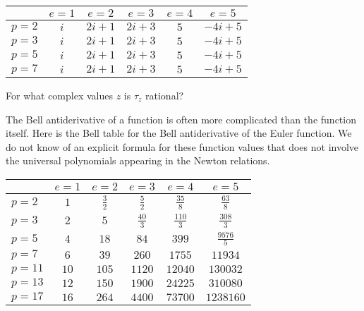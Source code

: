 \begin{example}
\begin{center}
\begin{tabular}{| l | | c | c | c | c | c |}
\hline
& $e = 1$ & $e = 2$ & $e = 3$ & $e = 4$ & $e = 5$\\
\hline
\hline
$p = 2$ & $i$ & $2 i + 1$ & $2 i + 3$ & $5$ & $-4 i + 5$ \\
\hline
$p = 3$ & $i$ & $2 i + 1$ & $2 i + 3$ & $5$ & $-4 i + 5$ \\
\hline
$p = 5$ & $i$ & $2 i + 1$ & $2 i + 3$ & $5$ & $-4 i + 5$ \\
\hline
$p = 7$ & $i$ & $2 i + 1$ & $2 i + 3$ & $5$ & $-4 i + 5$ \\
\hline
\end{tabular}
\end{center}
\end{example}

\begin{exercise}
For what complex values $z$ is $\tau_z$ rational?
\end{exercise}

\begin{example}
The Bell antiderivative of a function is often more complicated than the function itself. Here is the Bell table for the Bell antiderivative of the Euler function. We do not know of an explicit formula for these function values that does not involve the universal polynomials appearing in the Newton relations.
\vskip10pt
\begin{center}

\begin{tabular}{| l | | c | c | c | c | c |}
\hline
& $e = 1$ & $e = 2$ & $e = 3$ & $e = 4$ & $e = 5$\\
\hline
\hline
$p = 2$ & $1$ & $\frac{3}{2}$ & $\frac{5}{2}$ & $\frac{35}{8}$ & $\frac{63}{8}$ \\
\hline
$p = 3$ & $2$ & $5$ & $\frac{40}{3}$ & $\frac{110}{3}$ & $\frac{308}{3}$ \\
\hline
$p = 5$ & $4$ & $18$ & $84$ & $399$ & $\frac{9576}{5}$ \\
\hline
$p = 7$ & $6$ & $39$ & $260$ & $1755$ & $11934$ \\
\hline
$p = 11$ & $10$ & $105$ & $1120$ & $12040$ & $130032$ \\
\hline
$p = 13$ & $12$ & $150$ & $1900$ & $24225$ & $310080$ \\
\hline
$p = 17$ & $16$ & $264$ & $4400$ & $73700$ & $1238160$ \\
\hline
\end{tabular}
\end{center}

\end{example}

